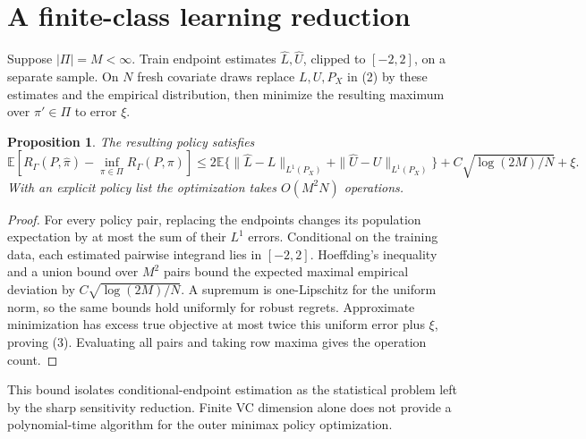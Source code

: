 \documentclass[11pt]{article}
\newtheorem{proposition}[theorem]{Proposition}
\theoremstyle{definition}
\begin{document}
\section*{A finite-class learning reduction}
Suppose $|\Pi|=M<\infty$. Train endpoint estimates $\widehat L,\widehat U$,
clipped to $[-2,2]$, on a separate sample. On $N$ fresh covariate draws
replace $L,U,P_X$ in (2) by these estimates and the empirical distribution,
then minimize the resulting maximum over $\pi'\in\Pi$ to error $\xi$.
\begin{proposition}
The resulting policy satisfies
\[
 \mathbb E[R_\Gamma(P,\widehat\pi)-\inf_{\pi\in\Pi}R_\Gamma(P,\pi)]
 \le2\mathbb E\{\|\widehat L-L\|_{L^1(P_X)}+
                 \|\widehat U-U\|_{L^1(P_X)}\}
       +C\sqrt{\log(2M)/N}+\xi.                         \tag{3}
\]
With an explicit policy list the optimization takes $O(M^2N)$ operations.
\end{proposition}
\begin{proof}
For every policy pair, replacing the endpoints changes its population
expectation by at most the sum of their $L^1$ errors. Conditional on the
training data, each estimated pairwise integrand lies in $[-2,2]$.
Hoeffding's inequality and a union bound over $M^2$ pairs bound the
expected maximal empirical deviation by $C\sqrt{\log(2M)/N}$.
A supremum is one-Lipschitz for the uniform norm, so the same bounds hold
uniformly for robust regrets. Approximate minimization has excess true
objective at most twice this uniform error plus $\xi$, proving (3).
Evaluating all pairs and taking row maxima gives the operation count.
\end{proof}
This bound isolates conditional-endpoint estimation as the statistical
problem left by the sharp sensitivity reduction. Finite VC dimension
alone does not provide a polynomial-time algorithm for the outer minimax
policy optimization.
\end{document}
